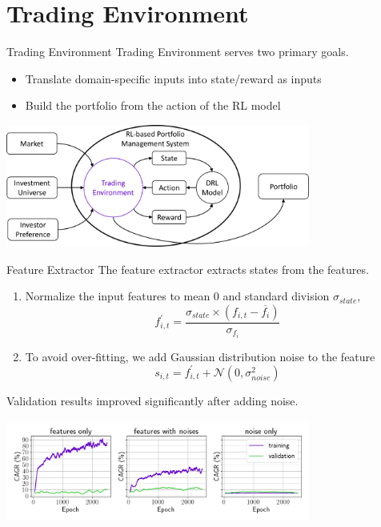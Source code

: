 \section{Trading Environment}

\begin{frame}{Trading Environment}
Trading Environment serves two primary goals.
\\
\begin{itemize}
    \item Translate domain-specific inputs into state/reward as inputs
    \item Build the portfolio from the action of the RL model
\end{itemize}
\begin{center}
  \includegraphics[width=10cm]{images/trading_environment.png}
\end{center}
\end{frame}

\begin{frame}{Feature Extractor}
The feature extractor extracts states from the features.
\begin{enumerate}
    \item {
    Normalize the input features to mean 0 and standard division \(\sigma_{state}\),
        \[
            f^{'}_{i,t} = \frac{\sigma_{state} \times   (f_{i,t} -  \overline{f_i})}{\sigma_{f_i}}
        \]
    }
    \item{To avoid over-fitting, we add Gaussian distribution noise to the feature
            \[
            s_{i,t} = f^{'}_{i,t} + \mathcal{N}(0,\sigma_{noise}^2)
        \]
    }
\end{enumerate}
\alert{Validation results improved significantly after adding noise.}
\begin{center}
  \includegraphics[width=10cm]{images/compare_noise.png}
\end{center}
\end{frame}

